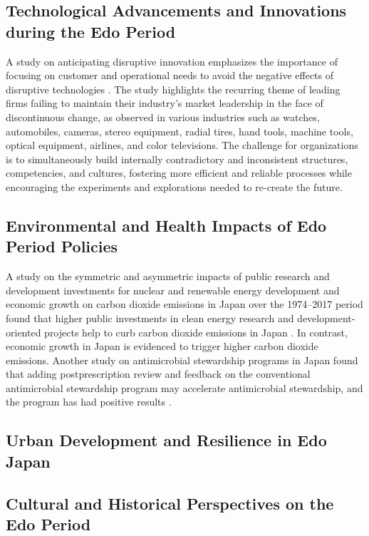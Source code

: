 \documentclass{article}
\begin{document}
\subsection{Technological Advancements and Innovations during the Edo Period}

A study on anticipating disruptive innovation emphasizes the importance of focusing on customer and operational needs to avoid the negative effects of disruptive technologies \cite{Paap2004ANTICIPATINGDI}. The study highlights the recurring theme of leading firms failing to maintain their industry's market leadership in the face of discontinuous change, as observed in various industries such as watches, automobiles, cameras, stereo equipment, radial tires, hand tools, machine tools, optical equipment, airlines, and color televisions. The challenge for organizations is to simultaneously build internally contradictory and inconsistent structures, competencies, and cultures, fostering more efficient and reliable processes while encouraging the experiments and explorations needed to re-create the future.

\subsection{Environmental and Health Impacts of Edo Period Policies}

A study on the symmetric and asymmetric impacts of public research and development investments for nuclear and renewable energy development and economic growth on carbon dioxide emissions in Japan over the 1974–2017 period found that higher public investments in clean energy research and development-oriented projects help to curb carbon dioxide emissions in Japan \cite{Ahmed2021MovingTA}. In contrast, economic growth in Japan is evidenced to trigger higher carbon dioxide emissions. Another study on antimicrobial stewardship programs in Japan found that adding postprescription review and feedback on the conventional antimicrobial stewardship program may accelerate antimicrobial stewardship, and the program has had positive results \cite{Akazawa2019EightYearEO}.

\subsection{Urban Development and Resilience in Edo Japan}

\subsection{Cultural and Historical Perspectives on the Edo Period}
\end{document}
